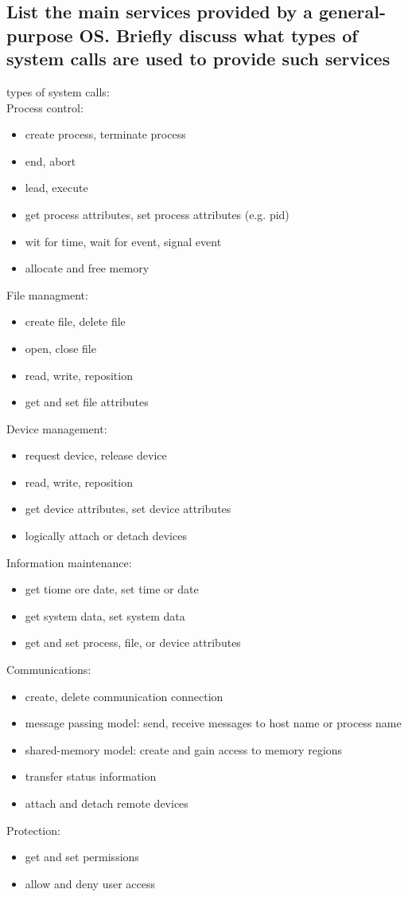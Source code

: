 \documentclass{article}
\begin{document}
\subsection{List the main services provided by a general-purpose OS. Briefly discuss what types of system calls are used to provide such services}
types of system calls:\\
Process control: \begin{itemize}
    \item create process, terminate process
    \item end, abort
    \item lead, execute
    \item get process attributes, set process attributes (e.g. pid)
    \item wit for time, wait for event, signal event
    \item allocate and free memory
\end{itemize}
File managment: \begin{itemize}
    \item create file, delete file
    \item open, close file
    \item read, write, reposition
    \item get and set file attributes
\end{itemize}
Device management: \begin{itemize}
    \item request device, release device
    \item read, write, reposition
    \item get device attributes, set device attributes
    \item logically attach or detach devices
\end{itemize}
Information maintenance: \begin{itemize}
    \item get tiome ore date, set time or date
    \item get system data, set system data
    \item get and set process, file, or device attributes
\end{itemize}
Communications: \begin{itemize}
    \item create, delete communication connection
    \item message passing model: send, receive messages to host name or process name
    \item shared-memory model: create and gain access to memory regions
    \item transfer status information
    \item attach and detach remote devices
\end{itemize}
Protection: \begin{itemize}
    \item get and set permissions
    \item allow and deny user access
\end{itemize}
\end{document}
